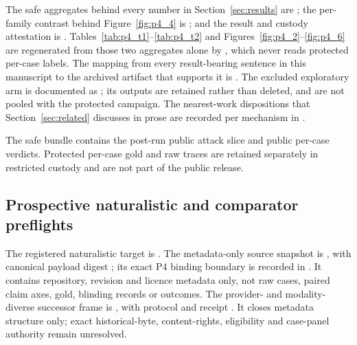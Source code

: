 The safe aggregates behind every number in Section~\ref{sec:results} are ; the per-family contrast behind Figure~\ref{fig:p4_4} is ; and the result and custody attestation is . Tables~\ref{tab:p4_t1}--\ref{tab:p4_t2} and Figures~\ref{fig:p4_2}--\ref{fig:p4_6} are regenerated from those two aggregates alone by , which never reads protected per-case labels. The mapping from every result-bearing sentence in this manuscript to the archived artifact that supports it is . The excluded exploratory arm is documented as ; its outputs are retained rather than deleted, and are not pooled with the protected campaign. The nearest-work dispositions that Section~\ref{sec:related} discusses in prose are recorded per mechanism in .

The safe bundle contains the post-run public attack slice and public per-case verdicts. Protected per-case gold and raw traces are retained separately in restricted custody and are not part of the public release.

\subsection{Prospective naturalistic and comparator preflights}
The registered naturalistic target is
. The
metadata-only source snapshot is
,
with canonical payload digest
;
its exact P4 binding boundary is recorded in
.
It contains repository, revision and licence metadata only, not raw cases,
paired claim axes, gold, blinding records or outcomes.
The provider- and modality-diverse successor frame is
,
with protocol
and receipt
.
It closes metadata structure only; exact
historical-byte, content-rights, eligibility and case-panel authority remain
unresolved.

